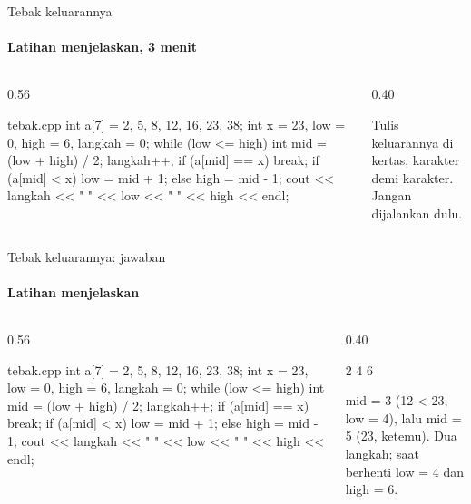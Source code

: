 \documentclass[t]{beamer}
\begin{document}
\begin{frame}[fragile]{Tebak keluarannya}
\framesubtitle{Latihan menjelaskan, 3 menit}
\begin{columns}[T]
\begin{column}{0.56\textwidth}
\begin{Kode}[listing options={style=ITERACodeKecil}]{tebak.cpp}
int a[7] = {2, 5, 8, 12, 16, 23, 38};
int x = 23, low = 0, high = 6, langkah = 0;
while (low <= high) {
    int mid = (low + high) / 2;
    langkah++;
    if (a[mid] == x) break;
    if (a[mid] < x) low = mid + 1;
    else high = mid - 1;
}
cout << langkah << " " << low << " " << high << endl;
\end{Kode}
\end{column}
\begin{column}{0.40\textwidth}
\begin{Catatan}
Tulis keluarannya di kertas, karakter demi karakter. Jangan dijalankan dulu.
\end{Catatan}
\end{column}
\end{columns}
\end{frame}

\begin{frame}[fragile]{Tebak keluarannya: jawaban}
\framesubtitle{Latihan menjelaskan}
\begin{columns}[T]
\begin{column}{0.56\textwidth}
\begin{Kode}[listing options={style=ITERACodeKecil}]{tebak.cpp}
int a[7] = {2, 5, 8, 12, 16, 23, 38};
int x = 23, low = 0, high = 6, langkah = 0;
while (low <= high) {
    int mid = (low + high) / 2;
    langkah++;
    if (a[mid] == x) break;
    if (a[mid] < x) low = mid + 1;
    else high = mid - 1;
}
cout << langkah << " " << low << " " << high << endl;
\end{Kode}
\end{column}
\begin{column}{0.40\textwidth}
\begin{Keluaran}[]
2 4 6
\end{Keluaran}
\begin{Catatan}
mid = 3 (12 < 23, low = 4), lalu mid = 5 (23, ketemu). Dua langkah; saat berhenti low = 4 dan high = 6.
\end{Catatan}
\end{column}
\end{columns}
\end{frame}
\end{document}
